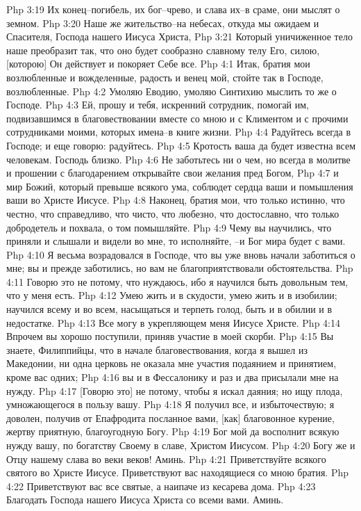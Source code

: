 Php 3:19  Их конец--погибель, их бог--чрево, и слава их--в сраме, они мыслят о земном.
Php 3:20  Наше же жительство--на небесах, откуда мы ожидаем и Спасителя, Господа нашего Иисуса Христа,
Php 3:21  Который уничиженное тело наше преобразит так, что оно будет сообразно славному телу Его, силою, [которою] Он действует и покоряет Себе все.
Php 4:1  Итак, братия мои возлюбленные и вожделенные, радость и венец мой, стойте так в Господе, возлюбленные.
Php 4:2  Умоляю Еводию, умоляю Синтихию мыслить то же о Господе.
Php 4:3  Ей, прошу и тебя, искренний сотрудник, помогай им, подвизавшимся в благовествовании вместе со мною и с Климентом и с прочими сотрудниками моими, которых имена--в книге жизни.
Php 4:4  Радуйтесь всегда в Господе; и еще говорю: радуйтесь.
Php 4:5  Кротость ваша да будет известна всем человекам. Господь близко.
Php 4:6  Не заботьтесь ни о чем, но всегда в молитве и прошении с благодарением открывайте свои желания пред Богом,
Php 4:7  и мир Божий, который превыше всякого ума, соблюдет сердца ваши и помышления ваши во Христе Иисусе.
Php 4:8  Наконец, братия мои, что только истинно, что честно, что справедливо, что чисто, что любезно, что достославно, что только добродетель и похвала, о том помышляйте.
Php 4:9  Чему вы научились, что приняли и слышали и видели во мне, то исполняйте, --и Бог мира будет с вами.
Php 4:10  Я весьма возрадовался в Господе, что вы уже вновь начали заботиться о мне; вы и прежде заботились, но вам не благоприятствовали обстоятельства.
Php 4:11  Говорю это не потому, что нуждаюсь, ибо я научился быть довольным тем, что у меня есть.
Php 4:12  Умею жить и в скудости, умею жить и в изобилии; научился всему и во всем, насыщаться и терпеть голод, быть и в обилии и в недостатке.
Php 4:13  Все могу в укрепляющем меня Иисусе Христе.
Php 4:14  Впрочем вы хорошо поступили, приняв участие в моей скорби.
Php 4:15  Вы знаете, Филиппийцы, что в начале благовествования, когда я вышел из Македонии, ни одна церковь не оказала мне участия подаянием и принятием, кроме вас одних;
Php 4:16  вы и в Фессалонику и раз и два присылали мне на нужду.
Php 4:17  [Говорю это] не потому, чтобы я искал даяния; но ищу плода, умножающегося в пользу вашу.
Php 4:18  Я получил все, и избыточествую; я доволен, получив от Епафродита посланное вами, [как] благовонное курение, жертву приятную, благоугодную Богу.
Php 4:19  Бог мой да восполнит всякую нужду вашу, по богатству Своему в славе, Христом Иисусом.
Php 4:20  Богу же и Отцу нашему слава во веки веков! Аминь.
Php 4:21  Приветствуйте всякого святого во Христе Иисусе. Приветствуют вас находящиеся со мною братия.
Php 4:22  Приветствуют вас все святые, а наипаче из кесарева дома.
Php 4:23  Благодать Господа нашего Иисуса Христа со всеми вами. Аминь.


